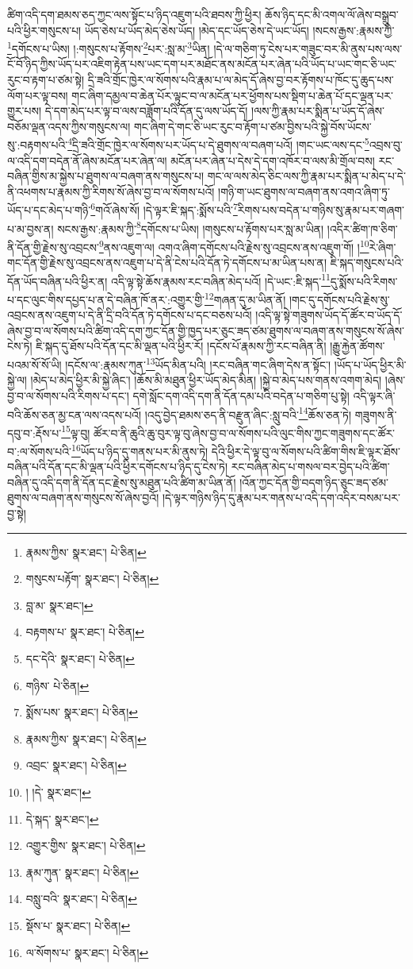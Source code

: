 ཚིག་འདི་དག་ཐམས་ཅད་ཀྱང་ལས་སྟོང་པ་ཉིད་འཇུག་པའི་ཐབས་ཀྱི་ཕྱིར། ཆོས་ཉིད་དང་མི་འགལ་ལོ་ཞེས་བསྒྲུབ་པའི་ཕྱིར་གསུངས་པ། ཡོད་ཅེས་པ་ཡོད་མེད་ཅེས་ཡོད། །མེད་དང་ཡོད་ཅེས་དེ་ཡང་ཡོད། །སངས་རྒྱས་:རྣམས་ཀྱི་\footnote{རྣམས་ཀྱིས་  སྣར་ཐང་།  པེ་ཅིན། }དགོངས་པ་ཡིས། །:གསུངས་པ་རྟོགས་\footnote{གསུངས་པརྟོག་  སྣར་ཐང་།  པེ་ཅིན། }པར་:སླ་མ་\footnote{བླ་མ་  སྣར་ཐང་། }ཡིན། །དེ་ལ་གཅིག་ཏུ་ངེས་པར་གཟུང་བར་མི་ནུས་པས་ལས་ངོ་བོ་ཉིད་ཀྱིས་ཡོད་པར་འཇིག་རྟེན་པས་ཡང་དག་པར་མཐོང་ནས་མངོན་པར་ཞེན་པའི་ཡོད་པ་ཡང་གང་ཅི་ཡང་རུང་བ་རྟག་པ་ཙམ་སྟེ། དྲི་ཟའི་གྲོང་ཁྱེར་ལ་སོགས་པའི་རྣམ་པ་ལ་མེད་དོ་ཞེས་བྱ་བར་རྟོགས་པ་ཁོང་དུ་ཆུད་པས་ལོག་པར་ལྟ་བས། གང་ཞིག་དམྱལ་བ་ཆེན་པོར་ལྟུང་བ་ལ་མངོན་པར་ཕྱོགས་པས་སྡིག་པ་ཆེན་པོ་དང་ལྡན་པར་གྱུར་པས། དེ་དག་མེད་པར་ལྟ་བ་ལས་བཟློག་པའི་དོན་དུ་ལས་ཡོད་དོ། །ལས་ཀྱི་རྣམ་པར་སྨིན་པ་ཡོད་དོ་ཞེས་བཅོམ་ལྡན་འདས་ཀྱིས་གསུངས་ལ། གང་ཞིག་དེ་གང་ཅི་ཡང་རུང་བ་རྟོག་པ་ཙམ་བྱིས་པའི་སྐྱེ་བོས་ཡོངས་སུ་:བརྟགས་པའི་\footnote{བརྟགས་པ་  སྣར་ཐང་།  པེ་ཅིན། }དྲི་ཟའི་གྲོང་ཁྱེར་ལ་སོགས་པར་ཡོད་པ་དེ་ཐུགས་ལ་བཞག་པའོ། །གང་ཡང་ལས་དང་\footnote{དང་དེའི་  སྣར་ཐང་།  པེ་ཅིན། }འབྲས་བུ་ལ་འདི་དག་བདེན་ནོ་ཞེས་མངོན་པར་ཞེན་ལ། མངོན་པར་ཞེན་པ་དེས་དེ་དག་འཁོར་བ་ལས་མི་གྲོལ་བས། རང་བཞིན་གྱིས་མ་སྐྱེས་པ་ཐུགས་ལ་བཞག་ནས་གསུངས་པ། གང་ལ་ལས་མེད་ཅིང་ལས་ཀྱི་རྣམ་པར་སྨིན་པ་མེད་པ་དེ་ནི་འཕགས་པ་རྣམས་ཀྱི་རིགས་སོ་ཞེས་བྱ་བ་ལ་སོགས་པའོ། །གཉི་ག་ཡང་ཐུགས་ལ་བཞག་ནས་འགའ་ཞིག་ཏུ་ཡོད་པ་དང་མེད་པ་གཉི་\footnote{གཉིས་  པེ་ཅིན། }གའོ་ཞེས་སོ། །དེ་ལྟར་ཇི་སྐད་:སྨོས་པའི་\footnote{སྨོས་པས་  སྣར་ཐང་།  པེ་ཅིན། }རིགས་པས་བདེན་པ་གཉིས་སུ་རྣམ་པར་གཞག་པ་མ་བྱས་ན། སངས་རྒྱས་:རྣམས་ཀྱི་\footnote{རྣམས་ཀྱིས་  སྣར་ཐང་།  པེ་ཅིན། }དགོངས་པ་ཡིས། །གསུངས་པ་རྟོགས་པར་སླ་མ་ཡིན། །འདིར་ཚིག་ཁ་ཅིག་ནི་དོན་གྱི་རྗེས་སུ་འབྲངས་\footnote{འབྲང་  སྣར་ཐང་།  པེ་ཅིན། }ནས་འཇུག་ལ། འགའ་ཞིག་དགོངས་པའི་རྗེས་སུ་འབྲངས་ནས་འཇུག་གོ། །\footnote{། །དེ་  སྣར་ཐང་། }རེ་ཞིག་གང་དོན་གྱི་རྗེས་སུ་འབྲངས་ནས་འཇུག་པ་དེ་ནི་ངེས་པའི་དོན་ཏེ་དགོངས་པ་མ་ཡིན་པས་ན། ཇི་སྐད་གསུངས་པའི་དོན་ཡོད་བཞིན་པའི་ཕྱིར་ན། འདི་ལྟ་སྟེ་ཆོས་རྣམས་རང་བཞིན་མེད་པའོ། །དེ་ཡང་:ཇི་སྐད་\footnote{དེ་སྐད་  སྣར་ཐང་། }དུ་སྨོས་པའི་རིགས་པ་དང་ལུང་གིས་དཔྱད་པ་ན་དེ་བཞིན་ཁོ་ནར་:འགྱུར་གྱི་\footnote{འགྱུར་གྱིས་  སྣར་ཐང་།  པེ་ཅིན། }གཞན་དུ་མ་ཡིན་ནོ། །གང་དུ་དགོངས་པའི་རྗེས་སུ་འབྲངས་ནས་འཇུག་པ་དེ་ནི་དྲི་བའི་དོན་ཏེ་དགོངས་པ་དང་བཅས་པའོ། །འདི་ལྟ་སྟེ་གཟུགས་ཡོད་དོ་ཚོར་བ་ཡོད་དོ་ཞེས་བྱ་བ་ལ་སོགས་པའི་ཚིག་འདི་དག་ཀྱང་དོན་གྱི་ཁྱད་པར་ཅུང་ཟད་ཙམ་ཐུགས་ལ་བཞག་ནས་གསུངས་སོ་ཞེས་ངེས་ཏེ། ཇི་སྐད་དུ་ཐོས་པའི་དོན་དང་མི་ལྡན་པའི་ཕྱིར་རོ། །དངོས་པོ་རྣམས་ཀྱི་རང་བཞིན་ནི། །རྒྱུ་རྐྱེན་ཚོགས་པའམ་སོ་སོ་ཡི། །དངོས་ལ་:རྣམས་ཀུན་\footnote{རྣམ་ཀུན་  སྣར་ཐང་།  པེ་ཅིན། }ཡོད་མིན་པའི། །རང་བཞིན་གང་ཞིག་དེས་ན་སྟོང་། །ཡོད་པ་ཡོད་ཕྱིར་མི་སྐྱེ་ལ། །མེད་པ་མེད་ཕྱིར་མི་སྐྱེ་ཞིང་། །ཆོས་མི་མཐུན་ཕྱིར་ཡོད་མེད་མིན། །སྐྱེ་བ་མེད་པས་གནས་འགག་མེད། །ཞེས་བྱ་བ་ལ་སོགས་པའི་རིགས་པ་དང་། དགེ་སློང་དག་འདི་དག་ནི་དོན་དམ་པའི་བདེན་པ་གཅིག་པུ་སྟེ། འདི་ལྟར་ཞི་བའི་ཆོས་ཅན་མྱ་ངན་ལས་འདས་པའོ། །འདུ་བྱེད་ཐམས་ཅད་ནི་བརྫུན་ཞིང་:སླུ་བའི་\footnote{བསླུ་བའི་  སྣར་ཐང་།  པེ་ཅིན། }ཆོས་ཅན་ཏེ། གཟུགས་ནི་དབུ་བ་:རྡོས་པ་\footnote{སྡོས་པ་  སྣར་ཐང་།  པེ་ཅིན། }ལྟ་བུ། ཚོར་བ་ནི་ཆུའི་ཆུ་བུར་ལྟ་བུ་ཞེས་བྱ་བ་ལ་སོགས་པའི་ལུང་གིས་ཀྱང་གཟུགས་དང་ཚོར་བ་:ལ་སོགས་པའི་\footnote{ལ་སོགས་པ་  སྣར་ཐང་།  པེ་ཅིན། }ཡོད་པ་ཉིད་དུ་གནས་པར་མི་ནུས་ཏེ། དེའི་ཕྱིར་དེ་ལྟ་བུ་ལ་སོགས་པའི་ཚིག་གིས་ཇི་ལྟར་ཐོས་བཞིན་པའི་དོན་དང་མི་ལྡན་པའི་ཕྱིར་དགོངས་པ་ཉིད་དུ་ངེས་ཏེ། རང་བཞིན་མེད་པ་གསལ་བར་བྱེད་པའི་ཚིག་བཞིན་དུ་འདི་དག་ནི་དོན་དང་རྗེས་སུ་མཐུན་པའི་ཚིག་མ་ཡིན་ནོ། །འོན་ཀྱང་དོན་གྱི་བདག་ཉིད་ཅུང་ཟད་ཙམ་ཐུགས་ལ་བཞག་ནས་གསུངས་སོ་ཞེས་བྱའོ། །དེ་ལྟར་གཉིས་ཉིད་དུ་རྣམ་པར་གནས་པ་འདི་དག་འདིར་བསམ་པར་བྱ་སྟེ། 
